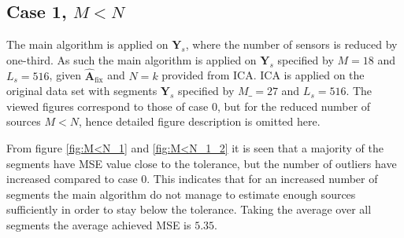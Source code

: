 \subsection{Case 1, $M < N$}
The main algorithm is applied on $\mathbf{Y}_s$, where the number of sensors is reduced by one-third. 
As such the main algorithm is applied on $\mathbf{Y}_s$ specified by $M = 18$ and $L_s = 516$, given $\hat{\mathbf{A}}_{\text{fix}}$ and $N = k$ provided from ICA. 
ICA is applied on the original data set with segments $\mathbf{Y}_s$ specified by $M\_ = 27$ and $L_s = 516$.  
The viewed figures correspond to those of case 0, but for the reduced number of sources $M < N$, hence detailed figure description is omitted here.   

From figure \ref{fig:M<N_1} and \ref{fig:M<N_1_2} it is seen that a majority of the segments have MSE value close to the tolerance, but the number of outliers have increased compared to case 0.
This indicates that for an increased number of segments the main algorithm do not manage to estimate enough sources sufficiently in order to stay below the tolerance. Taking the average over all segments the average achieved MSE is $5.35$.
